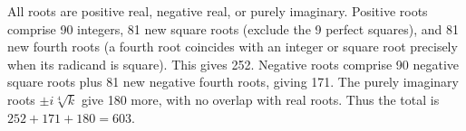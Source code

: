 All roots are positive real, negative real, or purely imaginary. Positive roots comprise 90 integers, 81 new square roots (exclude the 9 perfect squares), and 81 new fourth roots (a fourth root coincides with an integer or square root precisely when its radicand is square). This gives 252. Negative roots comprise 90 negative square roots plus 81 new negative fourth roots, giving 171. The purely imaginary roots $\pm i\sqrt[4]{k}$ give 180 more, with no overlap with real roots. Thus the total is $252+171+180=\boxed{603}$.

